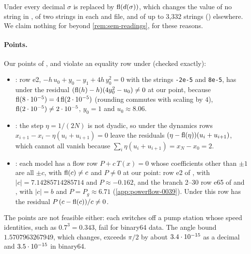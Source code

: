 Under  every decimal $\sigma$ is replaced by $\operatorname{fl}(d(\sigma))$, which changes the value of no string in , of two strings in each  and  file, and of up to 3,332 strings () elsewhere.
We claim nothing for  beyond \cref{rem:sem-readings}, for these reasons.

\paragraph{Points.}
Our points of ,  and  violate an equality row under  (checked exactly):
\begin{itemize}\setlength{\itemsep}{0pt}\setlength{\parsep}{0pt}
\item {}: row e2, $-h\,u_0+y_0-y_1+4h\,y_0^2=0$ with the strings \texttt{-2e-5} and \texttt{8e-5}, has under  the residual $(\operatorname{fl}(h)-h)(4y_0^2-u_0)\ne0$ at our point, because $\operatorname{fl}(8\cdot10^{-5})=4\operatorname{fl}(2\cdot10^{-5})$ (rounding commutes with scaling by $4$), $\operatorname{fl}(2\cdot10^{-5})\ne2\cdot10^{-5}$, $y_0=1$ and $u_0\approx8.06$.
\item {}: the step $\eta=1/(2N)$ is not dyadic, so under  the dynamics rows $x_{i+1}-x_i-\eta(u_i+u_{i+1})=0$ leave the residuals $(\eta-\operatorname{fl}(\eta))(u_i+u_{i+1})$, which cannot all vanish because $\sum_i\eta(u_i+u_{i+1})=x_N-x_0=2$.
\item {}: each model has a flow row $P+c\,T(x)=0$ whose coefficients other than $\pm1$ are all $\pm c$, with $\operatorname{fl}(c)\ne c$ and $P\ne0$ at our point: row e2 of , with $|c|=7.14285714285714$ and $P\approx-0.162$, and the branch 2--30 row e65 of  and , with $|c|=b$ and $P=P_g\approx6.71$ (\cref{app:powerflow-0039}).
Under  this row has the residual $P\,(c-\operatorname{fl}(c))/c\ne0$.
\end{itemize}
The  points are not feasible either: each switches off a pump station whose speed identities, such as $0.7^3=0.343$, fail for binary64 data.
The  angle bound $1.5707963267949$, which  changes, exceeds $\pi/2$ by about $3.4\cdot 10^{-15}$ as a decimal and $3.5\cdot 10^{-15}$ in binary64.

